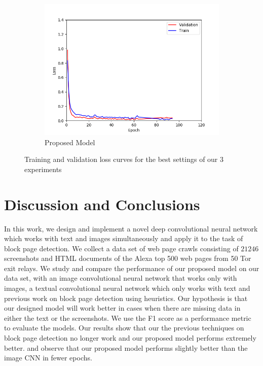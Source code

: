 \documentclass{article} %
\begin{document}
\begin{figure}
\begin{subfigure}[b]{0.3\textwidth}
        \centering
        \includegraphics[width=\textwidth]{model_val_train.png}
        \caption{Proposed Model}
        \label{fig:servererror}
    \end{subfigure}
    \caption{Training and validation loss curves for the best settings of our $3$ experiments}
    \label{fig:sample_dataset}
\end{figure}


\section{Discussion and Conclusions}
\label{sec:discussion}
In this work, we design and implement a novel deep convolutional neural network which works with text and images simultaneously and apply it to the task of block page detection. We collect a data set of web page crawls consisting of $21246$ screenshots and HTML documents of the Alexa top 500 web pages from 50 Tor exit relays. We study and compare the performance of our proposed model on our data set, with an image convolutional neural network that works only with images, a textual convolutional neural network which only works with text and previous work on block page detection using heuristics. Our hypothesis is that our designed model will work better in cases when there are missing data in either the text or the screenshots. We use the F1 score as a performance metric to evaluate the models. Our results show that our the previous techniques on block page detection no longer work and our proposed model performs extremely better. and observe that our proposed model performs slightly better than the image CNN in fewer epochs.
\end{document}
